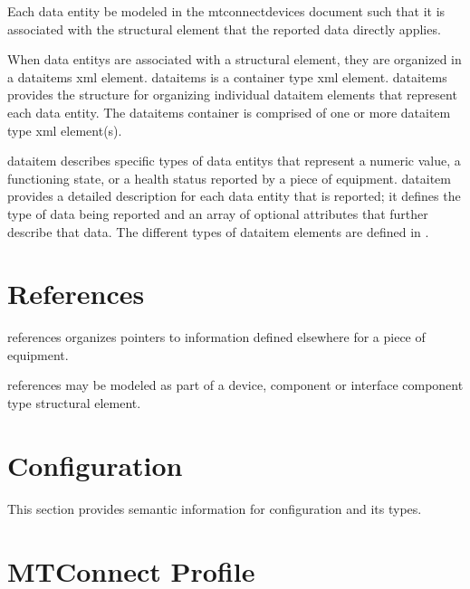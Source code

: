 Each \gls{data entity} \should be modeled in the \gls{mtconnectdevices} document such that it is associated with the \gls{structural element} that the reported data directly applies.

When \glspl{data entity} are associated with a \gls{structural element}, they are organized in a \gls{dataitems} \gls{xml} element.   \gls{dataitems} is a container type \gls{xml} element.  \gls{dataitems} provides the structure for organizing individual \gls{dataitem} elements that represent each \gls{data entity}. The \gls{dataitems} container is comprised of one or more \gls{dataitem} type \gls{xml} element(s).

\gls{dataitem} describes specific types of \glspl{data entity} that represent a numeric value, a functioning state, or a health status reported by a piece of equipment.   \gls{dataitem} provides a detailed description for each \gls{data entity} that is reported; it defines the type of data being reported and an array of optional attributes that further describe that data.   The different types of \gls{dataitem} elements are defined in .





\section{References}
\label{sec:References}
\gls{references} organizes pointers to information defined elsewhere for a piece of equipment.

\gls{references} may be modeled as part of a \gls{device}, \gls{component} or \gls{interface component} type \gls{structural element}.


\section{Configuration}
\label{sec:Configuration}
This section provides semantic information for \gls{configuration} and its types.







\section{MTConnect Profile}
\label{sec:MTConnect Profile}


